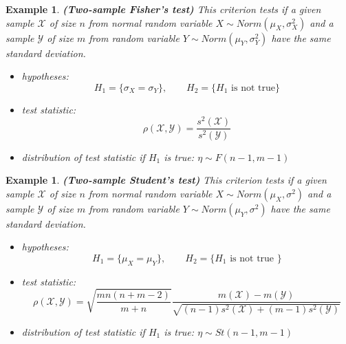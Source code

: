 \documentclass[12pt]{article}
\newtheorem{example}[theorem]{Example}
\begin{document}
\begin{example} \textbf{(Two-sample Fisher's test)} This criterion tests if a
    given sample $\mathscr{X}$ of size $n$ from normal random variable
    $X\sim Norm(\mu_X,\sigma_X^2)$ and a sample $\mathscr{Y}$ of size $m$ from
    random variable $Y\sim Norm(\mu_Y,\sigma_Y^2)$ have the same standard
    deviation.
    \begin{itemize}
        \item hypotheses:
              $$
                  H_1=\{\sigma_X=\sigma_Y\},\quad\quad H_2
                  =\{H_1\mbox{ is not true}\}
              $$
        \item test statistic:
              $$
                  \rho(\mathscr{X},\mathscr{Y})
                  =\frac{s^2(\mathscr{X})}{s^2(\mathscr{Y})}
              $$
        \item distribution of test statistic if $H_1$ is true:
              $\eta\sim F(n-1,m-1)$
    \end{itemize}
\end{example}

\begin{example} \textbf{(Two-sample Student's test)} This criterion tests if a
    given sample $\mathscr{X}$ of size $n$ from normal random variable $X\sim
        Norm(\mu_X,\sigma^2)$ and a sample $\mathscr{Y}$ of size $m$ from random
    variable $Y\sim Norm(\mu_Y,\sigma^2)$ have the same standard deviation.
    \begin{itemize}
        \item hypotheses:
              $$
                  H_1=\{\mu_X=\mu_Y\},\quad\quad H_2=\{H_1\mbox{ is not true }\}
              $$
        \item test statistic:
              $$
                  \rho(\mathscr{X},\mathscr{Y})
                  =\sqrt{\frac{mn(n+m-2)}{m+n}}\frac{m(\mathscr{X})
                      -m(\mathscr{Y})}{\sqrt{(n-1)s^2(\mathscr{X})
                          +(m-1)s^2(\mathscr{Y})}}
              $$
        \item distribution of test statistic if $H_1$ is true:
              $\eta\sim St(n-1,m-1)$
    \end{itemize}
\end{example}
\end{document}

